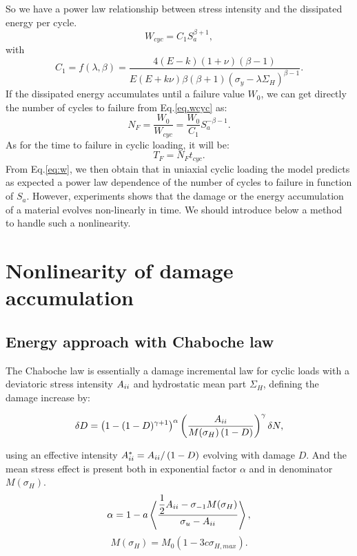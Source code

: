 So we have a power law relationship between stress intensity and the dissipated energy per cycle.
\begin{equation}
W_{cyc}=C_1S_{a}^{\beta+1},
\label{eq.wcyc}
\end{equation}
with 
$$C_1=f(\lambda,\beta)=\dfrac{4(E-k)(1+\nu)\left( \beta-1\right) }{ E(E+k\nu)\beta\left( \beta+1\right)\left(\sigma_y-\lambda \Sigma_H\right)^{\beta-1} }.$$
If the dissipated energy accumulates until a failure value $W_0$, we can get directly the number of cycles to failure from Eq.\eqref{eq.wcyc} as:
\begin{equation}
N_{F}=\dfrac{W_0}{W_{cyc}}=\dfrac{W_0}{C_1}S_{a}^{-\beta-1}.
\label{eq.NFcyc}
\end{equation}
As for the time to failure in cyclic loading, it will be:
$$T_{F}=N_{F}t_{cyc}.$$
From Eq.\eqref{eq:w}, we then obtain that in uniaxial cyclic loading the model predicts as expected a power law dependence of the number of cycles to failure in function of $S_{a}$.
However, experiments shows that the damage or the energy accumulation of a material evolves non-linearly in time. We should introduce below a method to handle such a nonlinearity.

\section{Nonlinearity of damage accumulation}
\label{sec:5.6}
\subsection{Energy approach with Chaboche law}
The Chaboche law\cite{lemaitre1990mechanics} is essentially a damage incremental law for cyclic loads with a deviatoric stress intensity ${A}_{\uppercase\expandafter{\romannumeral2}}$ and hydrostatic mean part $\Sigma_H$, defining the damage increase by:

\begin{equation}\delta D = \left( 1 -(1-D)^{\gamma+1}\right)^\alpha \left(\frac{{A}_{\uppercase\expandafter{\romannumeral2}} }{M(\sigma_H)\left( 1-D\right)}\right)^\gamma \delta N ,
\label{chabochemulti}
\end{equation} 

using an effective intensity ${A}_{\uppercase\expandafter{\romannumeral2}}^*={A}_{\uppercase\expandafter{\romannumeral2}}/\left( 1-D\right) $ evolving with damage $D$. And the mean stress effect is present both in exponential factor $\alpha$ and in denominator $M(\sigma_H)$.
$$\alpha=1 - a\left\langle \dfrac{\dfrac{1}{2}{A}_{\uppercase\expandafter{\romannumeral2}}-\sigma_{-1}M(\sigma_H) }{\sigma_{u} -{A}_{\uppercase\expandafter{\romannumeral2}}}\right\rangle,$$
$$M(\sigma_H) =M_0 \left(1-3c\sigma_{H,max}\right).$$

